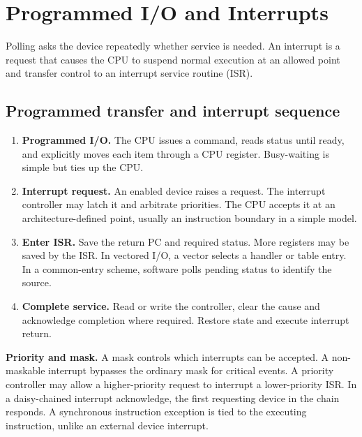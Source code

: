 \documentclass[12pt,a4paper]{article}
\begin{document}
\section{Programmed I/O and Interrupts}
\begin{tcolorbox}[defbox,title={Polling and interrupt}]
Polling asks the device repeatedly whether service is needed. An interrupt is a request that causes the CPU to suspend normal execution at an allowed point and transfer control to an interrupt service routine (ISR).
\end{tcolorbox}
\subsection{Programmed transfer and interrupt sequence}
\begin{enumerate}[leftmargin=*,itemsep=3pt]
\item \textbf{Programmed I/O.} The CPU issues a command, reads status until ready, and explicitly moves each item through a CPU register. Busy-waiting is simple but ties up the CPU.
\item \textbf{Interrupt request.} An enabled device raises a request. The interrupt controller may latch it and arbitrate priorities. The CPU accepts it at an architecture-defined point, usually an instruction boundary in a simple model.
\item \textbf{Enter ISR.} Save the return PC and required status. More registers may be saved by the ISR. In vectored I/O, a vector selects a handler or table entry. In a common-entry scheme, software polls pending status to identify the source.
\item \textbf{Complete service.} Read or write the controller, clear the cause and acknowledge completion where required. Restore state and execute interrupt return.
\end{enumerate}
\textbf{Priority and mask.} A mask controls which interrupts can be accepted. A non-maskable interrupt bypasses the ordinary mask for critical events. A priority controller may allow a higher-priority request to interrupt a lower-priority ISR. In a daisy-chained interrupt acknowledge, the first requesting device in the chain responds. A synchronous instruction exception is tied to the executing instruction, unlike an external device interrupt.
\end{document}
